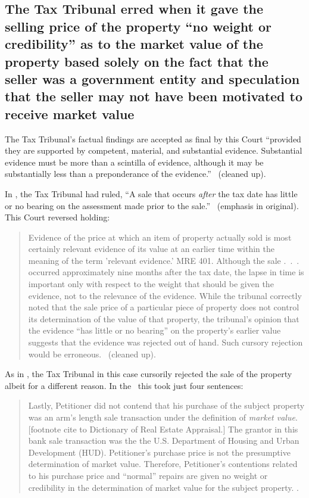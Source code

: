 \documentclass[12pt,\documentclassflag]{michiganCourtOfAppealsBrief}
\begin{document}
\subsection{The Tax Tribunal erred when it gave the selling price of the property ``no weight or credibility'' as to the market value of the property based solely on the fact that the seller was a government entity and speculation that the seller may not have been motivated to receive market value}

The Tax Tribunal's factual findings are accepted as final by this Court ``provided they are supported by competent, material, and substantial evidence. Substantial evidence must be more than a scintilla of evidence, although it may be substantially less than a preponderance of the evidence.'' \ (cleaned up).

In \cite[s]{Jones & Laughlin}, the Tax Tribunal had ruled, ``A sale that occurs \textit{after} the tax date has little or no bearing on the assessment made prior to the sale.'' \ (emphasis in original). This Court reversed holding: 

\begin{quote}
Evidence of the price at which an item of property actually sold is most certainly relevant evidence of its value at an earlier time within the meaning of the term 'relevant evidence.' MRE 401. Although the sale .~.~. occurred approximately nine months after the tax date, the lapse in time is important only with respect to the weight that should be given the evidence, not to the relevance of the evidence. While the tribunal correctly noted that the sale price of a particular piece of property does not control its determination of the value of that property, the tribunal's opinion that the evidence ``has little or no bearing'' on the property's earlier value suggests that the evidence was rejected out of hand. Such cursory rejection would be erroneous. \ (cleaned up).
\end{quote} 

As in \cite[s]{Jones & Laughlin}, the Tax Tribunal in this case cursorily rejected the sale of the property albeit for a different reason. In the \fojAbbr\ this took just four sentences: 

\begin{quote}
	Lastly, Petitioner did not contend that his purchase of the subject property was an arm's length sale transaction under the definition of \textit{market value}. [footnote cite to Dictionary of Real Estate Appraisal.] The grantor in this bank sale transaction was the the U.S. Department of Housing and Urban Development (HUD). Petitioner's purchase price is not the presumptive determination of market value. Therefore, Petitioner's contentions related to his purchase price and ``normal'' repairs are given no weight or credibility in the determination of market value for the subject property. \foj[6].
\end{quote}
\end{document}
